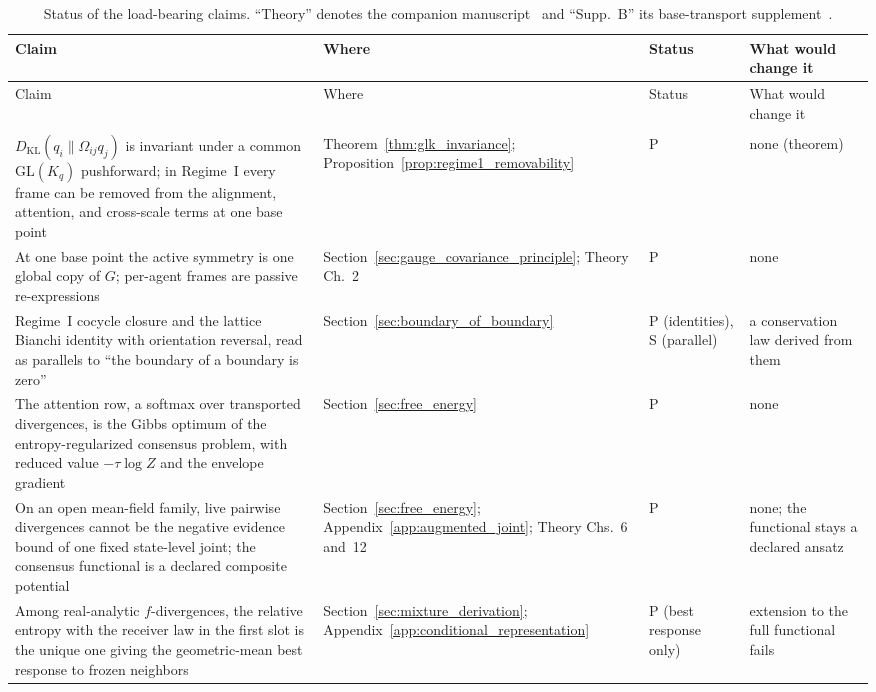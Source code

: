 \documentclass[11pt]{article}
\begin{document}
{\small
\setlength{\LTcapwidth}{\textwidth}
\begin{longtable}{@{}>{\raggedright\arraybackslash}p{}>{\raggedright\arraybackslash}p{}>{\raggedright\arraybackslash}p{}>{\raggedright\arraybackslash}p{}@{}}
\caption{Status of the load-bearing claims. ``Theory'' denotes the companion manuscript~\cite{DennisGaugeVFE2026} and ``Supp.~B'' its base-transport supplement~\cite{DennisGaugeVFESuppB2026}.}\label{tab:claim_status}\\
\toprule
Claim & Where & Status & What would change it \\
\midrule
\endfirsthead
\toprule
Claim & Where & Status & What would change it \\
\midrule
\endhead
\bottomrule
\endfoot
\multicolumn{4}{@{}l}{\emph{Part I: the construction}}\\
$D_{\mathrm{KL}}(q_i\|\Omega_{ij}q_j)$ is invariant under a common $\mathrm{GL}(K_q)$ pushforward; in Regime~I every frame can be removed from the alignment, attention, and cross-scale terms at one base point & Theorem~\ref{thm:glk_invariance}; Proposition~\ref{prop:regime1_removability} & P & none (theorem) \\
At one base point the active symmetry is one global copy of $G$; per-agent frames are passive re-expressions & Section~\ref{sec:gauge_covariance_principle}; Theory Ch.~2 & P & none \\
Regime~I cocycle closure and the lattice Bianchi identity with orientation reversal, read as parallels to ``the boundary of a boundary is zero'' & Section~\ref{sec:boundary_of_boundary} & P (identities), S (parallel) & a conservation law derived from them \\
The attention row, a softmax over transported divergences, is the Gibbs optimum of the entropy-regularized consensus problem, with reduced value $-\tau\log Z$ and the envelope gradient & Section~\ref{sec:free_energy} & P & none \\
On an open mean-field family, live pairwise divergences cannot be the negative evidence bound of one fixed state-level joint; the consensus functional is a declared composite potential & Section~\ref{sec:free_energy}; Appendix~\ref{app:augmented_joint}; Theory Chs.~6 and~12 & P & none; the functional stays a declared ansatz \\
Among real-analytic $f$-divergences, the relative entropy with the receiver law in the first slot is the unique one giving the geometric-mean best response to frozen neighbors & Section~\ref{sec:mixture_derivation}; Appendix~\ref{app:conditional_representation} & P (best response only) & extension to the full functional fails \\

\end{longtable}}
\end{document}
